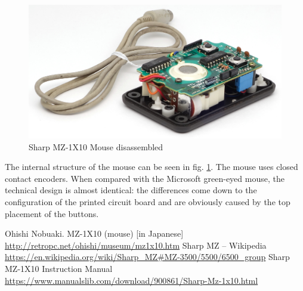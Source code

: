 \documentclass[11pt, a4paper]{article}
\begin{document}
\begin{figure}[h]
    \centering
    \includegraphics[scale=0.8]{1983_sharp_mz_1x10_mouse/inside_30.jpg}
    \caption{Sharp MZ-1X10 Mouse disassembled}
    \label{fig:SharpMZ1x10Inside}
\end{figure}

The internal structure of the mouse can be seen in fig. \ref{fig:SharpMZ1x10Inside}. The mouse uses closed contact encoders. When compared with the Microsoft green-eyed mouse, the technical design is almost identical: the differences come down to the configuration of the printed circuit board and are obviously caused by the top placement of the buttons.

\begin{thebibliography}{9}
  Ohishi Nobuaki. MZ-1X10 (mouse) [in Japanese] \url{http://retropc.net/ohishi/museum/mz1x10.htm}
 Sharp MZ -- Wikipedia \url{https://en.wikipedia.org/wiki/Sharp_MZ#MZ-3500/5500/6500_group}
 Sharp MZ-1X10 Instruction Manual \url{https://www.manualslib.com/download/900861/Sharp-Mz-1x10.html}
\end{thebibliography}
\end{document}
